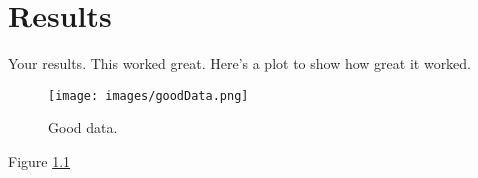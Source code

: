 \chapter{Results}
\label{chap:results}

Your results.  This worked great.  Here's a plot to show how great it worked.  

\begin{figure}[htp] 
\centering
\texttt{[image: images/goodData.png]}
\caption{Good data.}
\label{fig:goodData}
\end{figure} 

Figure \ref{fig:goodData}
